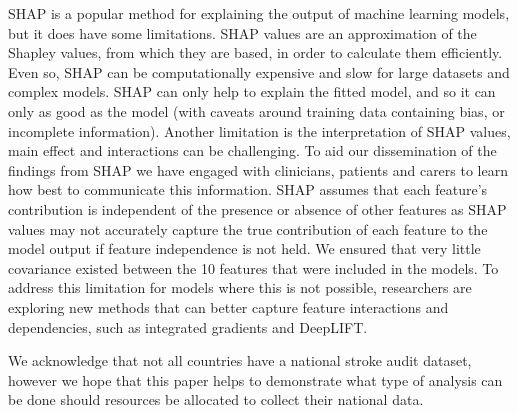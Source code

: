 SHAP is a popular method for explaining the output of machine learning models, but it does have some limitations. SHAP values are an approximation of the Shapley values, from which they are based, in order to calculate them efficiently. Even so, SHAP can be computationally expensive and slow for large datasets and complex models. SHAP can only help to explain the fitted model, and so it can only as good as the model (with caveats around training data containing bias, or incomplete information). Another limitation is the interpretation of SHAP values, main effect and interactions can be challenging. To aid our dissemination of the findings from SHAP we have engaged with clinicians, patients and carers to learn how best to communicate this information. SHAP assumes that each feature's contribution is independent of the presence or absence of other features as SHAP values may not accurately capture the true contribution of each feature to the model output if feature independence is not held. We ensured that very little covariance existed between the 10 features that were included in the models. To address this limitation for models where this is not possible, researchers are exploring new methods that can better capture feature interactions and dependencies, such as integrated gradients and DeepLIFT.

We acknowledge that not all countries have a national stroke audit dataset, however we hope that this paper helps to demonstrate what type of analysis can be done should resources be allocated to collect their national data.